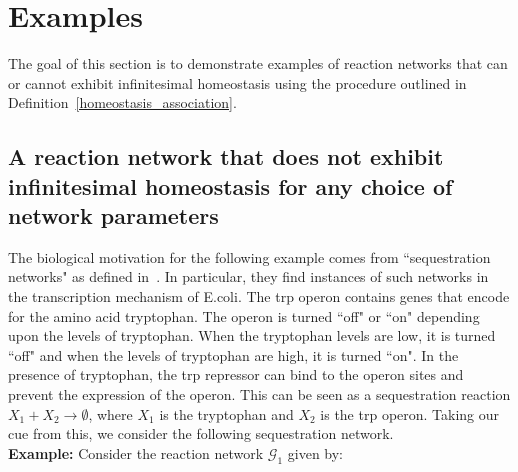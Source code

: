 \documentclass[11pt]{article}
\theoremstyle{plain}
\theoremstyle{definition}
\theoremstyle{remark}
\newcommand\GG{\mathcal{G}}
\begin{document}
\section{Examples}\label{sec:examples}

The goal of this section is to demonstrate examples of reaction networks that can or cannot exhibit infinitesimal homeostasis using the procedure outlined in Definition~\ref{homeostasis_association}. 

\subsection{A reaction network that does not exhibit infinitesimal homeostasis for any choice of network parameters}

The biological motivation for the following example comes from ``sequestration networks" as defined in~\cite{joshi2015survey,felix2016analyzing}. In particular, they find instances of such networks in the transcription mechanism of E.coli. The trp operon contains genes that encode for the amino acid tryptophan. The operon is turned ``off" or ``on" depending upon the levels of tryptophan. When the tryptophan levels are low, it is turned ``off" and when the levels of tryptophan are high, it is turned ``on". In the presence of tryptophan, the trp repressor can bind to the operon sites and prevent the expression of the operon. This can be seen as a sequestration reaction $X_1 + X_2 \rightarrow \emptyset$, where $X_1$ is the tryptophan and $X_2$ is the trp operon. Taking our cue from this, we consider the following sequestration network.\\
 
\textbf{Example:} Consider the reaction network $\GG_1$ given by:
\end{document}
